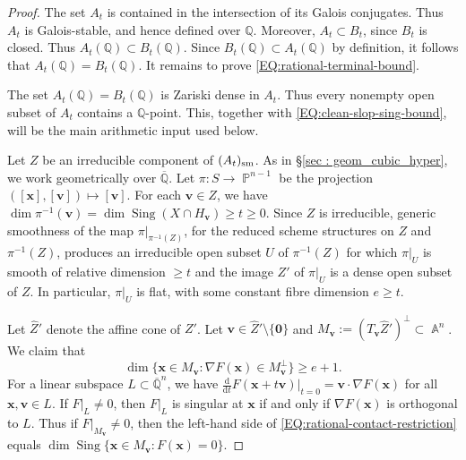 \documentclass[a4paper,11pt, twoside,reqno]{amsart}
\theoremstyle{plain}
\theoremstyle{definition}
\theoremstyle{remark}
\newcommand{\bfv}{\bm{v}}
\newcommand{\bfx}{\bm{x}}
\newcommand{\QQ}{\mathbb{Q}}
\DeclareMathOperator{\sing}{Sing}
\DeclareMathOperator{\A}{\mathbb{A}}
\DeclareMathOperator{\PP}{\mathbb{P}}
\renewcommand{\ge}{\geqslant}
\newcommand{\Qbar}{\overline{\mathbb{Q}}}
\newcommand{\cone}{\widehat}
\numberwithin{equation}{section}
\begin{document}
\begin{proof}
The set $A_t$ is contained in the intersection of its Galois conjugates.
Thus $A_t$ is Galois-stable, and hence defined over $\QQ$.
Moreover, $A_t \subset B_t$, since $B_t$ is closed.
Thus $A_t(\QQ) \subset B_t(\QQ)$.
Since $B_t(\QQ) \subset A_t(\QQ)$ by definition,
it follows that $A_t(\QQ)=B_t(\QQ)$.
It remains to prove \eqref{EQ:rational-terminal-bound}.

The set $A_t(\QQ)=B_t(\QQ)$
is Zariski dense in $A_t$.
Thus every nonempty open subset of $A_t$
contains a $\QQ$-point.
This, together with \eqref{EQ:clean-slop-sing-bound},
will be the main arithmetic input used below.

Let $Z$ be an irreducible component of $(A_t)_{\rm sm}$.
As in \S\ref{sec : geom_cubic_hyper}, we work geometrically over $\Qbar$.
Let $\pi\colon S \to \PP^{n-1}$ be the projection $([\bfx],[\bfv]) \mapsto [\bfv]$.
For each $\bfv\in Z$, we have $\dim \pi^{-1}(\bfv) = \dim \sing(X\cap H_{\bfv}) \ge t \ge 0$.
Since $Z$ is irreducible,
generic smoothness of the map $\pi\vert_{\pi^{-1}(Z)}$,
for the reduced scheme structures on $Z$ and $\pi^{-1}(Z)$,
produces an irreducible open subset $U$ of $\pi^{-1}(Z)$
for which $\pi\vert_U$ is smooth of relative dimension $\ge t$
and the image $Z'$ of $\pi\vert_U$ is a dense open subset of $Z$.
In particular, $\pi\vert_U$ is flat,
with some constant fibre dimension $e\ge t$.

Let $\cone Z'$ denote the affine cone of $Z'$.
Let $\bfv\in \cone Z' \setminus \{\bm0\}$
and $M_{\bfv} := (T_{\bfv} \cone Z')^\perp \subset \A^n$.
We claim that
\begin{equation}
\label{EQ:rational-contact-restriction}
\dim\{\bfx\in M_{\bfv}:\nabla F(\bfx)\in M_{\bfv}^\perp\}\ge e+1.
\end{equation}
For a linear subspace $L\subset \Qbar^n$,
we have $\frac{\mathrm{d}}{\mathrm{d}t} F(\bfx+t\bfv) \vert_{t=0}
= \bfv\cdot \nabla F(\bfx)$ for all $\bfx,\bfv\in L$.
If $F\vert_L\ne 0$,
then $F\vert_L$ is singular at $\bfx$
if and only if $\nabla F(\bfx)$ is orthogonal to $L$.
Thus if $F\vert_{M_{\bfv}} \ne 0$,
then the left-hand side of \eqref{EQ:rational-contact-restriction}
equals $\dim\sing\{\bfx\in M_{\bfv}:F(\bfx)=0\}$.


\end{proof}
\end{document}
